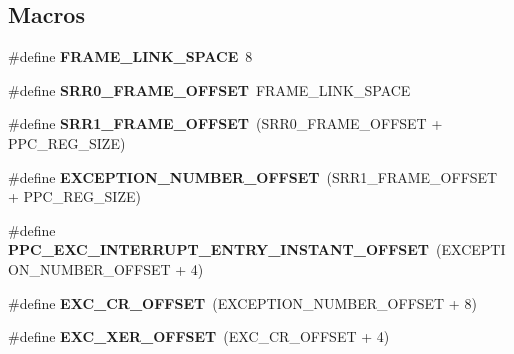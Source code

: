 \subsection*{Macros}
\begin{DoxyCompactItemize}
\item 
\mbox{\label{group__RTEMSScoreCPUPowerPC_ga2db6a50afcf6caf836170c0295c89945}} 
\#define {\bfseries F\+R\+A\+M\+E\+\_\+\+L\+I\+N\+K\+\_\+\+S\+P\+A\+CE}~8
\item 
\mbox{\label{group__RTEMSScoreCPUPowerPC_ga100d27c91caef5b64ca1a30955c21528}} 
\#define {\bfseries S\+R\+R0\+\_\+\+F\+R\+A\+M\+E\+\_\+\+O\+F\+F\+S\+ET}~F\+R\+A\+M\+E\+\_\+\+L\+I\+N\+K\+\_\+\+S\+P\+A\+CE
\item 
\mbox{\label{group__RTEMSScoreCPUPowerPC_ga16dd865ecd2297aa51c0654c89871505}} 
\#define {\bfseries S\+R\+R1\+\_\+\+F\+R\+A\+M\+E\+\_\+\+O\+F\+F\+S\+ET}~(S\+R\+R0\+\_\+\+F\+R\+A\+M\+E\+\_\+\+O\+F\+F\+S\+ET + P\+P\+C\+\_\+\+R\+E\+G\+\_\+\+S\+I\+ZE)
\item 
\mbox{\label{group__RTEMSScoreCPUPowerPC_ga00ab41b97e9ab4583060d09288f1c556}} 
\#define {\bfseries E\+X\+C\+E\+P\+T\+I\+O\+N\+\_\+\+N\+U\+M\+B\+E\+R\+\_\+\+O\+F\+F\+S\+ET}~(S\+R\+R1\+\_\+\+F\+R\+A\+M\+E\+\_\+\+O\+F\+F\+S\+ET + P\+P\+C\+\_\+\+R\+E\+G\+\_\+\+S\+I\+ZE)
\item 
\mbox{\label{group__RTEMSScoreCPUPowerPC_ga52bfe48a7e429e97ff057307a34e3b07}} 
\#define {\bfseries P\+P\+C\+\_\+\+E\+X\+C\+\_\+\+I\+N\+T\+E\+R\+R\+U\+P\+T\+\_\+\+E\+N\+T\+R\+Y\+\_\+\+I\+N\+S\+T\+A\+N\+T\+\_\+\+O\+F\+F\+S\+ET}~(E\+X\+C\+E\+P\+T\+I\+O\+N\+\_\+\+N\+U\+M\+B\+E\+R\+\_\+\+O\+F\+F\+S\+ET + 4)
\item 
\mbox{\label{group__RTEMSScoreCPUPowerPC_ga9376e379677c1a20cfce748a65efd72c}} 
\#define {\bfseries E\+X\+C\+\_\+\+C\+R\+\_\+\+O\+F\+F\+S\+ET}~(E\+X\+C\+E\+P\+T\+I\+O\+N\+\_\+\+N\+U\+M\+B\+E\+R\+\_\+\+O\+F\+F\+S\+ET + 8)
\item 
\mbox{\label{group__RTEMSScoreCPUPowerPC_gad6999c648334263cc9846ece9121912c}} 
\#define {\bfseries E\+X\+C\+\_\+\+X\+E\+R\+\_\+\+O\+F\+F\+S\+ET}~(E\+X\+C\+\_\+\+C\+R\+\_\+\+O\+F\+F\+S\+ET + 4)

\end{DoxyCompactItemize}
